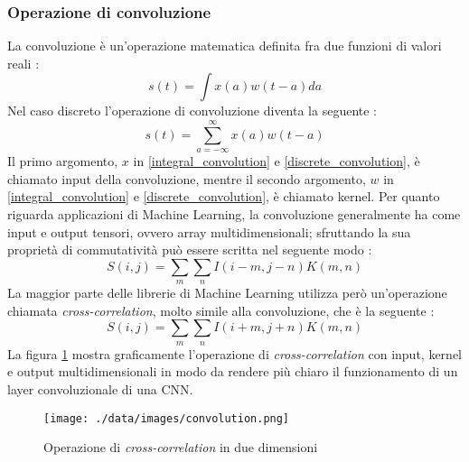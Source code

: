 \subsubsection{Operazione di convoluzione}
La convoluzione è un'operazione matematica definita fra due funzioni di valori reali \cite{goodfellow2016deep}:
\begin{equation}
	s(t)=\int{x(a)w(t-a)da}
	\label{integral_convolution}
\end{equation}
Nel caso discreto l'operazione di convoluzione diventa la seguente \cite{goodfellow2016deep}:
\begin{equation}
	s(t)=\sum_{a=-\infty}^{\infty}{x(a)w(t-a)}
	\label{discrete_convolution}
\end{equation}
Il primo argomento, $x$ in \ref{integral_convolution} e \ref{discrete_convolution}, è chiamato input della convoluzione, mentre il secondo argomento, $w$ in \ref{integral_convolution} e \ref{discrete_convolution}, è chiamato kernel.
Per quanto riguarda applicazioni di Machine Learning, la convoluzione generalmente ha come input e output tensori, ovvero array multidimensionali; sfruttando la sua proprietà di commutatività può essere scritta nel seguente modo \cite{goodfellow2016deep}:
\begin{equation}
	S(i,j)=\sum_{m}{\sum_{n}{I(i-m,j-n)K(m,n)}}
	\label{multidimensional_convolution}
\end{equation}
La maggior parte delle librerie di Machine Learning utilizza però un'operazione chiamata \textit{cross-correlation}, molto simile alla convoluzione, che è la seguente \cite{goodfellow2016deep}:
\begin{equation}
S(i,j)=\sum_{m}{\sum_{n}{I(i+m,j+n)K(m,n)}}
\label{cross-correlation}
\end{equation}
La figura \ref{convolution} mostra graficamente l'operazione di \textit{cross-correlation} con input, kernel e output multidimensionali in modo da rendere più chiaro il funzionamento di un layer convoluzionale di una CNN.
\begin{figure}
	\centering
	\texttt{[image: ./data/images/convolution.png]}
	\caption{Operazione di \textit{cross-correlation} in due dimensioni \cite{goodfellow2016deep} }
	\label{convolution}
\end{figure}


\iffalse
\subsubsection{Layer convoluzionale}
Un layer convoluzionale è un array di \textit{feature-maps}; una \textit{feature-map} è una matrice di neuroni; neuroni appartenenti alla stessa \textit{feature-map} sono caratterizzati dagli stessi pesi; questa è una caratteristica molto importante di un layer convoluzionale, perché, oltre a diminuire il numero di parametri rispetto ai classici layer \textit{fully-connected}, rende la rete invariante rispetto alle traslazioni dell'input: essendo i pesi di ogni neurone identici in una stessa \textit{feature-map}, ogni neurone reagirà allo stesso modo a stessi valori di input in qualsiasi zona dell'immagine essi si trovino.
\fi


